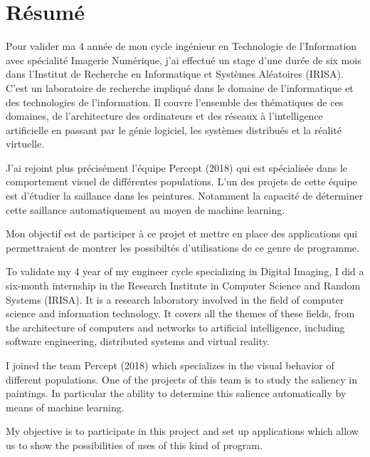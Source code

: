 \chapter*{Résumé}
\par
    Pour valider ma 4 année de mon cycle ingénieur en Technologie de 
    l'Information avec spécialité Imagerie Numérique, j'ai effectué un stage 
    d'une durée de six mois dans l'Institut de Recherche en Informatique et 
    Systèmes Aléatoires (IRISA). C'est un laboratoire de recherche impliqué dans 
    le domaine de l'informatique et des technologies de l'information. Il couvre 
    l'ensemble des thématiques de ces domaines, de l’architecture des 
    ordinateurs et des réseaux à l’intelligence artificielle en passant par le 
    génie logiciel, les systèmes distribués et la réalité virtuelle.

\par
    J'ai rejoint plus précisément l'équipe Percept (2018) qui est spécialisée 
    dans le comportement visuel de différentes populations. L'un des projets de 
    cette équipe est d'étudier la saillance dans les peintures. Notamment la capacité 
    de déterminer cette saillance automatiquement au moyen de machine learning.

\par
    Mon objectif est de participer à ce projet et mettre en place des 
    applications qui permettraient de montrer les possibiltés d'utilisations de 
    ce genre de programme.

\vspace{40pt}

\color{gray}
\par
    To validate my 4 year of my engineer cycle specializing in Digital 
    Imaging, I did a six-month internship in the Research Institute in Computer 
    Science and Random Systems (IRISA). It is a research laboratory involved in 
    the field of computer science and information technology. It covers all the 
    themes of these fields, from the architecture of computers and networks to 
    artificial intelligence, including software engineering, distributed systems 
    and virtual reality. 

\par
    I joined the team Percept (2018) which specializes in the visual behavior of 
    different populations. One of the projects of this team is to study the 
    saliency in paintings. In particular the ability to determine this salience 
    automatically by means of machine learning. 

\par
    My objective is to participate in this project and set up applications which 
    allow us to show the possibilities of uses of this kind of program.

\color{black}